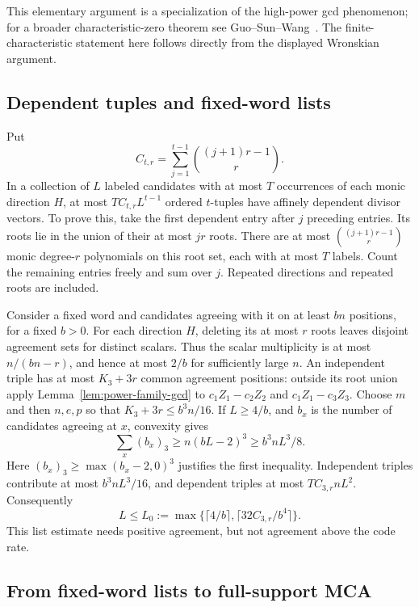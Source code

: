 This elementary argument is a specialization of the high-power gcd
phenomenon; for a broader characteristic-zero theorem see
Guo--Sun--Wang~\cite[Theorem 11]{guo-sun-wang-gcd}. The finite-characteristic
statement here follows directly from the displayed Wronskian argument.

\subsection{Dependent tuples and fixed-word lists}

Put
\[
 C_{t,r}=\sum_{j=1}^{t-1}\binom{(j+1)r-1}{r}.
\]
In a collection of $L$ labeled candidates with at most $T$ occurrences
of each monic direction $H$, at most $TC_{t,r}L^{t-1}$ ordered
$t$-tuples have affinely dependent divisor vectors. To prove this, take
the first dependent entry after $j$ preceding entries. Its roots lie in
the union of their at most $jr$ roots. There are at most
$\binom{(j+1)r-1}{r}$ monic degree-$r$ polynomials on this root set,
each with at most $T$ labels. Count the remaining entries freely and
sum over $j$. Repeated directions and repeated roots are included.

Consider a fixed word and candidates agreeing with it on at least
$bn$ positions, for a fixed $b>0$. For each direction $H$, deleting its
at most $r$ roots leaves disjoint agreement sets for distinct scalars.
Thus the scalar multiplicity is at most $n/(bn-r)$, and hence at most
$2/b$ for sufficiently large $n$.
An independent triple has at most $K_3+3r$ common agreement positions:
outside its root union apply Lemma~\ref{lem:power-family-gcd} to
$c_1Z_1-c_2Z_2$ and $c_1Z_1-c_3Z_3$.
Choose $m$ and then $n,e,p$ so that $K_3+3r\le b^3n/16$.
If $L\ge4/b$, and $b_x$ is the number of candidates agreeing at $x$,
convexity gives
\[
 \sum_x(b_x)_3\ge n(bL-2)^3\ge b^3nL^3/8.
\]
Here $(b_x)_3\ge\max(b_x-2,0)^3$ justifies the first inequality.
Independent triples contribute at most $b^3nL^3/16$, and dependent
triples at most $TC_{3,r}nL^2$. Consequently
\begin{equation}\label{eq:power-family-list}
 L\le L_0:=\max\{\lceil4/b\rceil,\lceil32C_{3,r}/b^4\rceil\}.
\end{equation}
This list estimate needs positive agreement, but not agreement above
the code rate.

\subsection{From fixed-word lists to full-support MCA}

